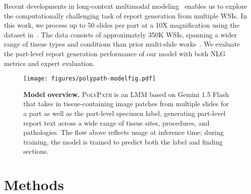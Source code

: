 \documentclass[11pt]{article}
\newcommand{\ourmodel}{\textsc{PolyPath}\xspace}
\begin{document}
Recent developments in long-context multimodal modeling~\citep{team2024gemini} enables us to explore the computationally challenging task of report generation from multiple WSIs. In this work, we process up to 50 slides per part at a 10X magnification using the dataset in~\citet{ahmed2024pathalign}. The data consists of approximately 350K WSIs, spanning a wider range of tissue types and conditions than prior multi-slide works~\citep{tran2024generating,tan2024clinical}. We evaluate the part-level report generation performance of our model with both NLG metrics and expert evaluation.


\begin{figure}[t]
    \centering
    \texttt{[image: figures/polypath-modelfig.pdf]}
    \caption{\small \textbf{Model overview.} \ourmodel is an LMM based on Gemini 1.5 Flash that takes in tissue-containing image patches from multiple slides for a part as well as the part-level specimen label, generating part-level report text across a wide range of tissue sites, procedures, and pathologies. The flow above reflects usage at inference time; during training, the model is trained to predict both the label and finding sections.}
    \label{fig:model}
\end{figure}

\section{Methods}
\end{document}
